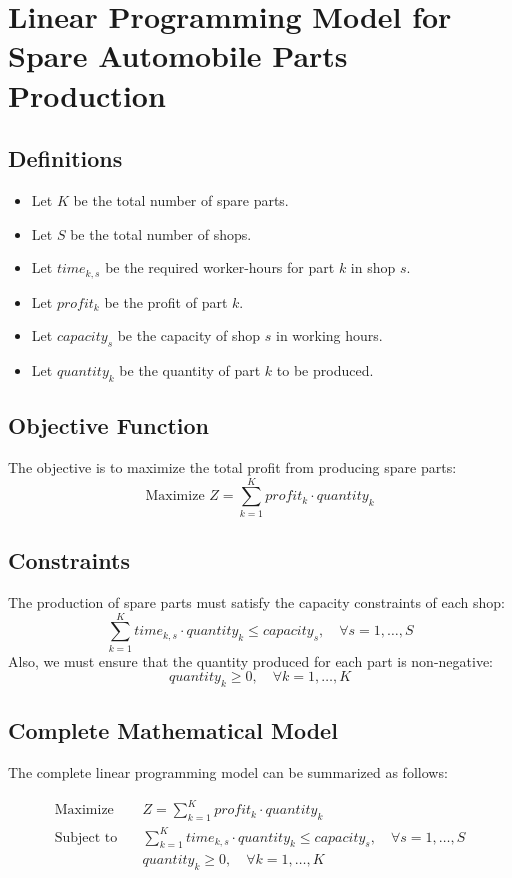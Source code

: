 \documentclass{article}
\begin{document}
\section*{Linear Programming Model for Spare Automobile Parts Production}

\subsection*{Definitions}
\begin{itemize}
    \item Let \( K \) be the total number of spare parts.
    \item Let \( S \) be the total number of shops.
    \item Let \( time_{k,s} \) be the required worker-hours for part \( k \) in shop \( s \).
    \item Let \( profit_{k} \) be the profit of part \( k \).
    \item Let \( capacity_{s} \) be the capacity of shop \( s \) in working hours.
    \item Let \( quantity_{k} \) be the quantity of part \( k \) to be produced.
\end{itemize}

\subsection*{Objective Function}
The objective is to maximize the total profit from producing spare parts:
\[
\text{Maximize } Z = \sum_{k=1}^{K} profit_{k} \cdot quantity_{k}
\]

\subsection*{Constraints}
The production of spare parts must satisfy the capacity constraints of each shop:
\[
\sum_{k=1}^{K} time_{k,s} \cdot quantity_{k} \leq capacity_{s}, \quad \forall s = 1, \ldots, S
\]
Also, we must ensure that the quantity produced for each part is non-negative:
\[
quantity_{k} \geq 0, \quad \forall k = 1, \ldots, K
\]

\subsection*{Complete Mathematical Model}
The complete linear programming model can be summarized as follows:

\begin{align*}
\text{Maximize} \quad & Z = \sum_{k=1}^{K} profit_{k} \cdot quantity_{k} \\
\text{Subject to} \quad & \sum_{k=1}^{K} time_{k,s} \cdot quantity_{k} \leq capacity_{s}, \quad \forall s = 1, \ldots, S \\
& quantity_{k} \geq 0, \quad \forall k = 1, \ldots, K
\end{align*}
\end{document}
